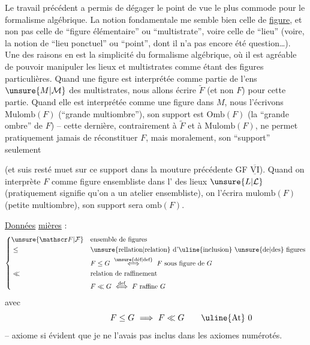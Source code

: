 Le travail précédent a permis de dégager le point de vue le plus commode pour le formalisme algébrique. La notion fondamentale me semble bien celle de \uline{figure}, et non pas celle de ``figure élémentaire'' ou ``multistrate'', voire celle de ``lieu'' (voire, la notion de ``lieu ponctuel'' ou ``point'', dont il n'a pas encore été question\ldots). Une des raisons en est la simplicité du formalisme algébrique,
%
 où il est agréable de pouvoir manipuler les lieux et multistrates comme étant des figures particulières. Quand une figure  est interprétée  comme partie de l'ens $\unsure{M|\mathcal M}$  des multistrates, nous allons écrire $\widetilde F$ (et non $F$) pour cette partie. Quand elle est interprétée comme une figure  dans $M$, nous l'écrivons $\mathrm{Mulomb}(F)$ (``grande multiombre''), son support est $\mathrm{Omb}(F)$ (la ``grande ombre'' de $F$) -- cette dernière, contrairement à $\widetilde F$ et à $\mathrm{Mulomb}(F)$, ne permet pratiquement jamais de réconstituer $F$,  mais moralement, son ``support'' seulement

(et  suis resté muet sur ce support dans la mouture précédente GF $\underline{\overline{\mathrm{VI}}}$). Quand on interprète $F$ comme figure ensembliste dans l' des lieux $\unsure{L|\mathcal L}$  (pratiquement  signifie qu'on a un atelier ensembliste), on l'écrira $\mathrm{mulomb}(F)$ (petite multiombre), son support sera $\mathrm{omb}(F)$.

\uline{Données} \uline{mières} :
\[
\left\{\begin{aligned}
&\unsure{\mathscr F|\mathcal F} &&\text{ensemble de figures}\\
&\leq &&\text{\unsure{rellation|relation} d'\uline{inclusion} \unsure{de|des} figures}\\
& &&F\leq G\ \overset{\text{\unsure{déf|def}}}{\Longleftrightarrow}\ F\ \text{sous figure de }G\\
&\ll &&\text{relation de raffinement}\\
& && F\ll G\ \overset{\text{def}}{\Longleftrightarrow}\ F\ \text{raffine }G
\end{aligned}\right.
\]
avec
\[
F\leq G\ \Longrightarrow\ F\ll G\tag*{\makebox[0pt][r]{\makebox[\displaywidth][l]{\uline{At} 0}}}
\]
-- axiome si évident que je ne l'avais pas inclus dans les axiomes numérotés.

